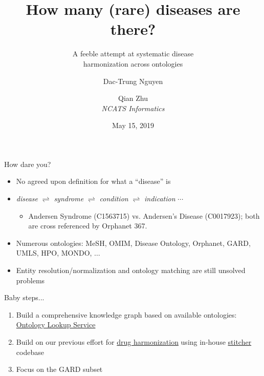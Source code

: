 ﻿\documentclass[anchorcolor=blue,linkcolor=blue]{beamer}
\title{How many (rare) diseases are there?}
\subtitle{A feeble attempt at systematic disease\\
  harmonization across ontologies}
\author{Dac-Trung Nguyen\and Qian Zhu\\[1em] \emph{NCATS Informatics}}
\date{May 15, 2019}
\begin{document}
\begin{frame}
  \titlepage
\end{frame}

\begin{frame}
  \begin{block}{How dare you?}
    \begin{itemize}
    \item No agreed upon definition for what a ``disease'' is
    \item \emph{disease} $\rightleftharpoons$ \emph{syndrome}
      $\rightleftharpoons$ \emph{condition} $\rightleftharpoons$
      \emph{indication} $\cdots$
      \begin{itemize}
        \item Andersen Syndrome (C1563715) vs. Andersen's Disease (C0017923); both are cross referenced by Orphanet 367.
      \end{itemize}
    \item Numerous ontologies: MeSH, OMIM, Disease Ontology, Orphanet,
      GARD, UMLS, HPO, MONDO, $\ldots$
    \item Entity resolution/normalization and ontology matching are
      still unsolved problems
    \end{itemize}
  \end{block}
  \begin{block}{Baby steps...}
    \begin{enumerate}
      \item Build a comprehensive knowledge graph based on available
        ontologies: \href{https://www.ebi.ac.uk/ols/ontologies}{Ontology
          Lookup Service}
      \item Build on our previous effort for
        \href{https://stitcher.ncats.io/app/stitches/latest}{drug harmonization} using
        in-house
        \href{https://spotlite.nih.gov/ncats/stitcher.git}{stitcher} codebase
      \item Focus on the GARD subset
    \end{enumerate}
  \end{block}
\end{frame}
\end{document}
